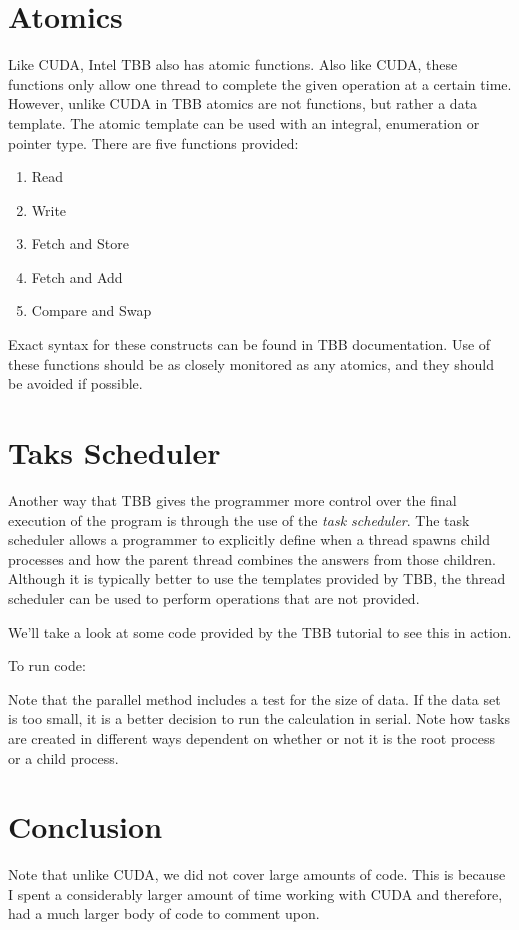 \documentclass{article}
\newcommand{\comp}[1]{{\ttfamily #1}}
\begin{document}
  \section{Atomics}
  Like CUDA, Intel TBB also has atomic functions. Also like CUDA, these functions only allow one thread to complete the given operation at a certain time. However, unlike CUDA in TBB atomics are not functions, but rather a data template. The \comp{atomic} template can be used with an integral, enumeration or pointer type. There are five functions provided:
  \begin{enumerate}
  \item Read
  \item Write
  \item Fetch and Store
  \item Fetch and Add
  \item Compare and Swap
  \end{enumerate}
  Exact syntax for these constructs can be found in TBB documentation. Use of these functions should be as closely monitored as any atomics, and they should be avoided if possible. 
  
  \section{Taks Scheduler}
  Another way that TBB gives the programmer more control over the final execution of the program is through the use of the \emph{task scheduler}. The task scheduler allows a programmer to explicitly define when a thread spawns child processes and how the parent thread combines the answers from those children. Although it is typically better to use the templates provided by TBB, the thread scheduler can be used to perform operations that are not provided.

  We'll take a look at some code provided by the TBB tutorial to see this in action.

  

  To run code:

  

  Note that the parallel method includes a test for the size of data. If the data set is too small, it is a better decision to run the calculation in serial. Note how tasks are created in different ways dependent on whether or not it is the root process or a child process.

  \section{Conclusion}
  Note that unlike CUDA, we did not cover large amounts of code. This is because I spent a considerably larger amount of time working with CUDA and therefore, had a much larger body of code to comment upon.
\end{document}
